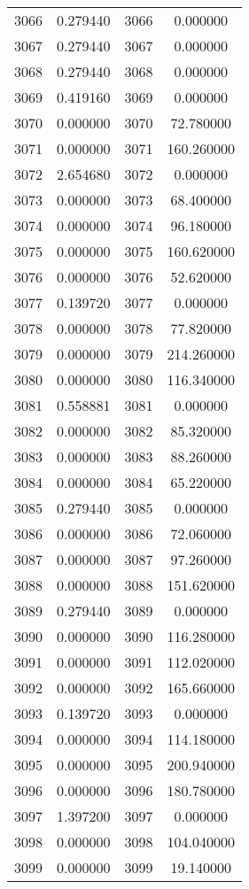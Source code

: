 \documentclass[12pt]{article}
\begin{document}
\begin{longtable}{@{}cccc@{}}
3066 & 0.279440 & 3066 & 0.000000 \\
3067 & 0.279440 & 3067 & 0.000000 \\
3068 & 0.279440 & 3068 & 0.000000 \\
3069 & 0.419160 & 3069 & 0.000000 \\
3070 & 0.000000 & 3070 & 72.780000 \\
3071 & 0.000000 & 3071 & 160.260000 \\
3072 & 2.654680 & 3072 & 0.000000 \\
3073 & 0.000000 & 3073 & 68.400000 \\
3074 & 0.000000 & 3074 & 96.180000 \\
3075 & 0.000000 & 3075 & 160.620000 \\
3076 & 0.000000 & 3076 & 52.620000 \\
3077 & 0.139720 & 3077 & 0.000000 \\
3078 & 0.000000 & 3078 & 77.820000 \\
3079 & 0.000000 & 3079 & 214.260000 \\
3080 & 0.000000 & 3080 & 116.340000 \\
3081 & 0.558881 & 3081 & 0.000000 \\
3082 & 0.000000 & 3082 & 85.320000 \\
3083 & 0.000000 & 3083 & 88.260000 \\
3084 & 0.000000 & 3084 & 65.220000 \\
3085 & 0.279440 & 3085 & 0.000000 \\
3086 & 0.000000 & 3086 & 72.060000 \\
3087 & 0.000000 & 3087 & 97.260000 \\
3088 & 0.000000 & 3088 & 151.620000 \\
3089 & 0.279440 & 3089 & 0.000000 \\
3090 & 0.000000 & 3090 & 116.280000 \\
3091 & 0.000000 & 3091 & 112.020000 \\
3092 & 0.000000 & 3092 & 165.660000 \\
3093 & 0.139720 & 3093 & 0.000000 \\
3094 & 0.000000 & 3094 & 114.180000 \\
3095 & 0.000000 & 3095 & 200.940000 \\
3096 & 0.000000 & 3096 & 180.780000 \\
3097 & 1.397200 & 3097 & 0.000000 \\
3098 & 0.000000 & 3098 & 104.040000 \\
3099 & 0.000000 & 3099 & 19.140000 \\

\end{longtable}
\end{document}
